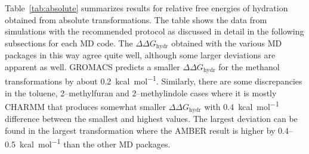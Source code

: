 \documentclass[journal=jctcce,manuscript=article]{achemso}
\begin{document}
Table~\ref{tab:absolute} summarizes results for relative free energies of 
hydration obtained from absolute transformations.  The table shows the data 
from simulations with the recommended protocol as discussed in detail in the 
following subsections for each MD code. The $\Delta\Delta G_{\mathrm{hydr}}$ 
obtained with the various MD packages in 
this way agree quite well, although some larger deviations are apparent as 
well.  GROMACS predicts a smaller $\Delta\Delta G_{\mathrm{hydr}}$ for the 
methanol transformations by about \SI{0.2}{kcal.mol^{-1}}.  Similarly, there 
are some discrepancies in the toluene, 2--methylfuran and 2--methylindole cases 
where it is mostly CHARMM that produces somewhat smaller $\Delta\Delta 
G_{\mathrm{hydr}}$ with \SI{0.4}{kcal.mol^{-1}} difference between the 
smallest and highest values.  The largest deviation can be found in the largest 
transformation where the AMBER result is higher by 0.4--\SI{0.5}{kcal.mol^{-1}} 
than the other MD packages.
\begin{table}[]
  \begin{minipage}{\linewidth}
    \caption{Comparing relative free energies of hydration for various MD 
    packages as obtained from absolute transformations.}\label{tab:absolute}
  \end{minipage}
\end{table}
\end{document}
